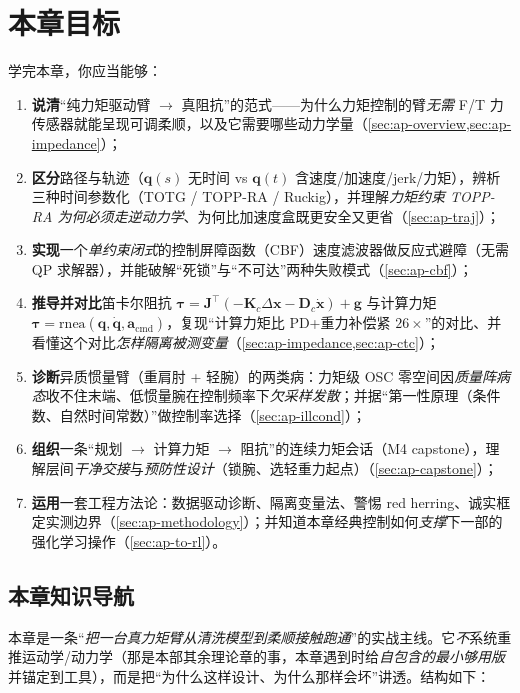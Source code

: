 \section*{本章目标}
学完本章，你应当能够：
\begin{enumerate}
  \item \textbf{说清}“纯力矩驱动臂 $\to$ 真阻抗”的范式——为什么力矩控制的臂\emph{无需} F/T 力传感器就能呈现可调柔顺，以及它需要哪些动力学量（\cref{sec:ap-overview,sec:ap-impedance}）；
  \item \textbf{区分}路径与轨迹（$\mathbf{q}(s)$ 无时间 vs $\mathbf{q}(t)$ 含速度/加速度/jerk/力矩），辨析三种时间参数化（TOTG / TOPP-RA / Ruckig），并理解\emph{力矩约束 TOPP-RA 为何必须走逆动力学}、为何比加速度盒既更安全又更省（\cref{sec:ap-traj}）；
  \item \textbf{实现}一个\emph{单约束闭式}的控制屏障函数（CBF）速度滤波器做反应式避障（无需 QP 求解器），并能破解“死锁”与“不可达”两种失败模式（\cref{sec:ap-cbf}）；
  \item \textbf{推导并对比}笛卡尔阻抗 $\boldsymbol{\tau}=\mathbf{J}^\top(-\mathbf{K}_c\Delta\mathbf{x}-\mathbf{D}_c\dot{\mathbf{x}})+\mathbf{g}$ 与计算力矩 $\boldsymbol{\tau}=\mathrm{rnea}(\mathbf{q},\dot{\mathbf{q}},\mathbf{a}_{\mathrm{cmd}})$，复现“计算力矩比 PD+重力补偿紧 $26\times$”的对比、并看懂这个对比\emph{怎样隔离被测变量}（\cref{sec:ap-impedance,sec:ap-ctc}）；
  \item \textbf{诊断}异质惯量臂（重肩肘 + 轻腕）的两类病：力矩级 OSC 零空间因\emph{质量阵病态}收不住末端、低惯量腕在控制频率下\emph{欠采样发散}；并据“第一性原理（条件数、自然时间常数）”做控制率选择（\cref{sec:ap-illcond}）；
  \item \textbf{组织}一条“规划 $\to$ 计算力矩 $\to$ 阻抗”的连续力矩会话（M4 capstone），理解层间\emph{干净交接}与\emph{预防性设计}（锁腕、选轻重力起点）（\cref{sec:ap-capstone}）；
  \item \textbf{运用}一套工程方法论：数据驱动诊断、隔离变量法、警惕 red herring、诚实框定实测边界（\cref{sec:ap-methodology}）；并知道本章经典控制如何\emph{支撑}下一部的强化学习操作（\cref{sec:ap-to-rl}）。
\end{enumerate}

\subsection*{本章知识导航}
本章是一条“\emph{把一台真力矩臂从清洗模型到柔顺接触跑通}”的实战主线。它\emph{不}系统重推运动学/动力学（那是本部其余理论章的事，本章遇到时给\emph{自包含的最小够用版}并锚定到工具），而是把“为什么这样设计、为什么那样会坏”讲透。结构如下：

